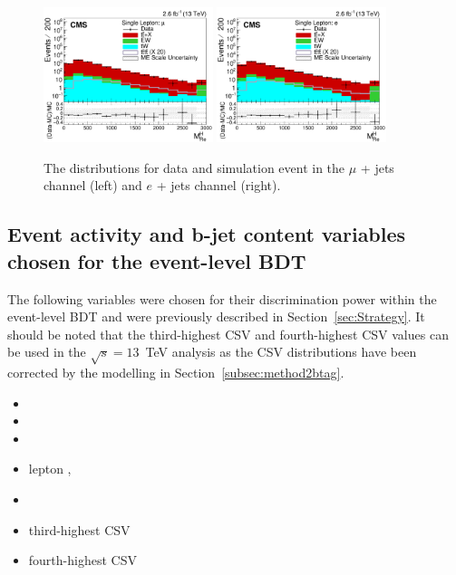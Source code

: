 \begin{figure}[ht!]
    \includegraphics[width=0.44\textwidth]{images/Run2/SumJetMassX_StackLogY.pdf}
    \includegraphics[width=0.44\textwidth]{images/Run2/SumJetMassX_StackLogY_e.pdf}
    \caption{ The \redhadmass distributions for data and simulation event in the $\mu$ + jets channel (left) and $e$ + jets channel (right).}
    \label{fig:sumjetmassx13}
\end{figure}


\subsection{Event activity and b-jet content variables chosen for the event-level BDT}
The following variables were chosen for their discrimination power within the event-level BDT and were previously described in Section~\ref{sec:Strategy}. It should be noted that the third-highest CSV and fourth-highest CSV values can be used in the $\sqrt{s} = 13$~TeV analysis as the CSV distributions have been corrected by the modelling in Section~\ref{subsec:method2btag}.


\begin{multicols}{2}
\setlength{\columnseprule}{0pt} 

\begin{itemize}
\item \htb
\item \htrat
\item \njets
\item lepton \pt, \leadleppt
\item \njetsw
\item third-highest CSV
\item fourth-highest CSV
\end{itemize}

\end{multicols}

